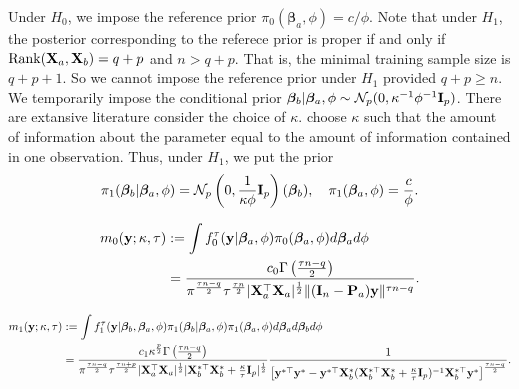 \documentclass[11pt]{article}
\DeclareMathOperator{\myrank}{Rank}
\newcommand{\By}{\mathbf{y}}    \newcommand{\Bz}{\mathbf{z}}
\newcommand{\bfsym}[1]{\ensuremath{\boldsymbol{#1}}}
\def\bbeta{\bfsym \beta}
\theoremstyle{plain}
\theoremstyle{definition}
\theoremstyle{remark}
\begin{document}
Under $H_0$, we impose the reference prior $\pi_0 (\bbeta_a,\phi)=c/\phi$.
Note that under $H_1$, the posterior corresponding to the referece prior is proper if and only if $\myrank (\BX_a, \BX_b)= q+p$ and $n>q + p$.
That is, the minimal training sample size is $q + p +1$.
So we cannot impose the reference prior under $ H_1$ provided $q + p  \geq n$.
We temporarily impose the conditional prior $\bbeta_b|\bbeta_a, \phi \sim \mathcal N_{p} (0, \kappa^{-1} \phi^{-1} \BI_{p}) $.
There are extansive literature consider the choice of $\kappa$.
\cite{Kass1995} choose $\kappa$ such that the amount of information about the parameter equal to the amount of information contained in one observation.
Thus, under $H_1$, we put the prior
\begin{equation*}
    \pi_1 (\bbeta_b | \bbeta_a, \phi) =
    \mathcal N_p\left(0,\frac{1}{\kappa \phi}\BI_p\right)(\bbeta_b)
    ,\quad
    \pi_1(\bbeta_a, \phi) = \frac{c}{\phi}.
\end{equation*}

\begin{equation*}
    \begin{split}
    m_0(\By;\kappa, \tau) 
    &:=
    \int f_0^\tau (\By|\bbeta_a,\phi) \pi_0 (\bbeta_a, \phi) d\bbeta_a d\phi
    \\
    &=
    \frac{
        c_0 \Gamma\left( \frac{\tau n - q}{2}\right)
    }{
        \pi^{\frac{\tau n - q }{2}}
        \tau^{\frac{\tau n}{2}}
        |\BX_a^\top \BX_a|^{\frac{1}{2}}
        \| (\BI_n -\BP_a) \By\|^{\tau n -q}
    }.
    \end{split}
\end{equation*}

\begin{equation*}
    \begin{split}
        m_1(\By;\kappa, \tau) 
    &:=
    \int f_1^\tau (\By|\bbeta_b,\bbeta_a,\phi) \pi_1 (\bbeta_b |\bbeta_a, \phi) \pi_1 (\bbeta_a, \phi)  d\bbeta_a d\bbeta_b d\phi
    \\
    &=
    \frac{c_1\kappa^{\frac p 2} \Gamma \left(\frac{\tau n -q}{2}\right)}{
        \pi^{\frac{\tau n -q}{ 2 }} \tau^{\frac{\tau n + p}{2}}
        |\BX_a^\top \BX_a|^{\frac 1 2}
        |\BX_b^{*\top} \BX_b^* + \frac{\kappa}{\tau } \BI_p|^{\frac 1 2}
    }
    \frac{1}{\left[ \By^{*\top} \By^* - \By^{*\top} \BX_b^* ( \BX_b^{*\top}\BX_b^* + \frac{\kappa}{\tau} \BI_p )^{-1} \BX_b^{*\top} \By^* \right]^{\frac{\tau n - q}{2}}}
    .
    \end{split}
\end{equation*}
\end{document}
